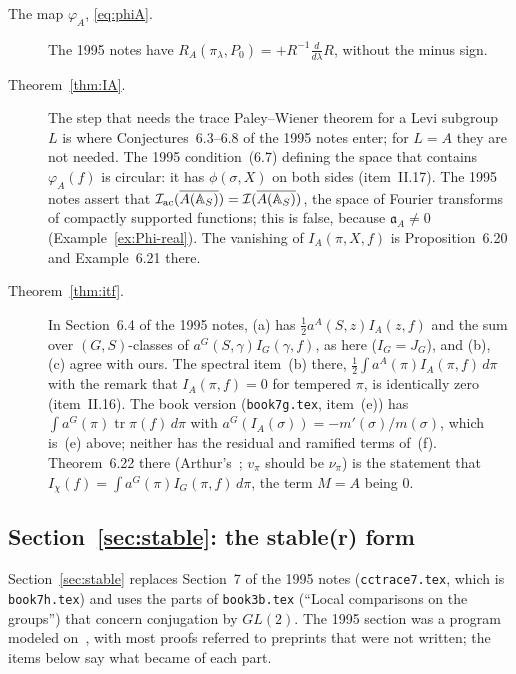 \begin{description}
\item[The map $\varphi_A$, \eqref{eq:phiA}.] The 1995 notes have $R_A(\pi_\lambda,P_0)=+R^{-1}\frac{d}{d\lambda}R$, without the minus sign.

\item[Theorem~\ref{thm:IA}.] The step that needs the trace Paley--Wiener theorem for a Levi subgroup $L$ is where Conjectures~6.3--6.8 of the 1995 notes enter; for $L=A$ they are not needed. The 1995 condition~(6.7) defining the space that contains $\varphi_A(f)$ is circular: it has $\phi(\sigma,X)$ on both sides (item~II.17). The 1995 notes assert that $\mathcal I_{\mathrm{ac}}(\overline{A(\mathbb{A}_S)})=\mathcal I(\overline{A(\mathbb{A}_S)})$, the space of Fourier transforms of compactly supported functions; this is false, because $\mathfrak a_A\ne0$ (Example~\ref{ex:Phi-real}). The vanishing of $I_A(\pi,X,f)$ is Proposition~6.20 and Example~6.21 there.

\item[Theorem~\ref{thm:itf}.] In Section~6.4 of the 1995 notes, (a) has $\frac12a^A(S,z)I_A(z,f)$ and the sum
over $(G,S)$-classes of $a^G(S,\gamma)I_G(\gamma,f)$, as here
($I_G=J_G$), and (b), (c) agree with ours. The spectral item~(b) there,
$\frac12\int a^A(\pi)I_A(\pi,f)\,d\pi$ with the remark that $I_A(\pi,f)=0$
for tempered $\pi$, is identically zero (item~II.16). The book version
(\texttt{book7g.tex}, item~(e)) has $\int a^G(\pi)\operatorname{tr}\pi(f)\,
d\pi$ with $a^G(I_A(\sigma))=-m'(\sigma)/m(\sigma)$, which is~(e) above;
neither has the residual and ramified terms of~(f). Theorem~6.22 there
(Arthur's~\cite[Cor.~4.5]{A10}; $v_\pi$ should be $\nu_\pi$) is the
statement that $I_\chi(f)=\int a^G(\pi)I_G(\pi,f)\,d\pi$, the term $M=A$
being $0$.

\end{description}


\subsection{Section~\ref{sec:stable}: the stable(r) form}

Section~\ref{sec:stable} replaces Section~7 of the 1995 notes
(\texttt{cctrace7.tex}, which is \texttt{book7h.tex}) and uses the parts
of \texttt{book3b.tex} (``Local comparisons on the groups'') that concern
conjugation by $GL(2)$. The 1995 section was a program modeled
on~\cite{LL}, with most proofs referred to preprints that were not
written; the items below say what became of each part.

